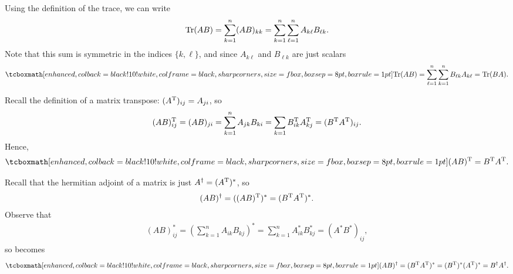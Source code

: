 \def\duedate{09/07/2022}
\def\HWnum{1}



    

Using the definition of the trace, we can write
\begin{eqnarray}
    \label{eq:trace-AB}
    {\rm Tr}(AB) = \sum_{k=1}^{n} (AB)_{kk} = \sum_{k=1}^{n} \sum_{\ell=1}^{n} A_{k\ell}B_{\ell k}
.\end{eqnarray}
Note that this sum is symmetric in the indices $\{ k,\ell \} $, and since $A_{k\ell}$ and $B_{\ell k}$ are just scalars 
\begin{eqnarray}
    \label{eq:trace-BA}
    \eqbox{
    {\rm Tr}(AB) = \sum_{\ell=1}^{n} \sum_{k=1}^{n} B_{\ell k}A_{k\ell} = {\rm Tr}(BA)
    } 
.\end{eqnarray}



Recall the definition of a matrix transpose: $(A^{\rm T})_{ij} = A_{ji}$, so
\begin{eqnarray}
    \label{eq:transpose-AB}
    (AB)^{\rm T}_{ij} = (AB)_{ji} = \sum_{k=1}^{n} A_{jk}B_{ki} = \sum_{k=1} B_{ik}^{\rm T} A_{kj}^{\rm T} = (B^{\rm T}A^{\rm T})_{ij}
.\end{eqnarray}
Hence,
\begin{eqnarray}
    \label{eq:prob3-result}
    \eqbox{
    (AB)^{\rm T} = B^{\rm T}A^{\rm T}
    }
.\end{eqnarray}




Recall that the hermitian adjoint of a matrix is just $A^{\dagger} = (A^{\rm T})^{*}$, so
\begin{eqnarray}
    \label{eq:adjoint-AB}
    (AB)^{\dagger} = ((AB)^{\rm T})^{*} = (B^{\rm T}A^{\rm T})^{*}
.\end{eqnarray}
Observe that 
\begin{eqnarray}
    \label{eq:complex-conj-product}
    (AB)^{*}_{ij} = \left( \sum_{k=1}^{n} A_{ik}B_{kj} \right)^{*} = \sum_{k=1}^{n} A^{*}_{ik}B^{*}_{kj} = (A^{*}B^{*})_{ij}
,\end{eqnarray}
so  becomes
\begin{eqnarray}
    \label{eq:adjoint-BA}
    \eqbox{
        (AB)^{\dagger} = (B^{\rm T}A^{\rm T})^{*} = (B^{\rm T})^{*}(A^{\rm T})^{*} = B^{\dagger}A^{\dagger}
    }
.\end{eqnarray}



